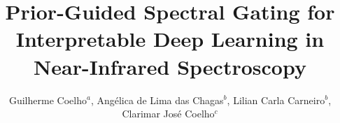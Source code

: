 \documentclass[preprint,12pt]{elsarticle}
\begin{document}
\begin{frontmatter}



\title{Prior-Guided Spectral Gating for Interpretable Deep Learning in Near-Infrared Spectroscopy}


\author{Guilherme Coelho$^a$, Angélica de Lima das Chagas$^{b}$, Lilian Carla Carneiro$^{b}$, Clarimar José Coelho$^c$} %


 

\end{frontmatter}
\end{document}
